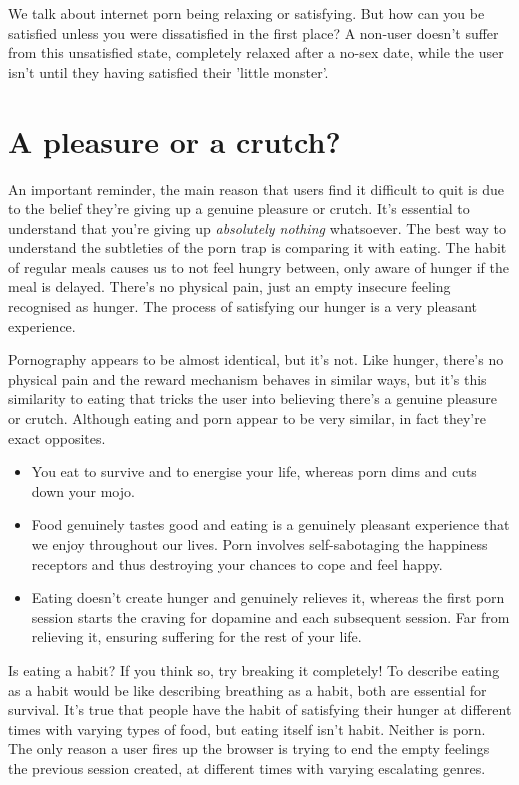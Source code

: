 \documentclass[easypeasy.tex]{subfiles}
\begin{document}
We talk about internet porn being relaxing or satisfying. But how can you be satisfied unless you were dissatisfied in the first place? A non-user doesn't suffer from this unsatisfied state, completely relaxed after a no-sex date, while the user isn't until they having satisfied their 'little monster'.

\section{A pleasure or a crutch?}
An important reminder, the main reason that users find it difficult to quit is due to the belief they're giving up a genuine pleasure or crutch. It's essential to understand that you're giving up \textit{absolutely nothing} whatsoever. The best way to understand the subtleties of the porn trap is comparing it with eating. The habit of regular meals causes us to not feel hungry between, only aware of hunger if the meal is delayed. There's no physical pain, just an empty insecure feeling recognised as hunger. The process of satisfying our hunger is a very pleasant experience.

Pornography appears to be almost identical, but it's not. Like hunger, there's no physical pain and the reward mechanism behaves in similar ways, but it's this similarity to eating that tricks the user into believing there's a genuine pleasure or crutch. Although eating and porn appear to be very similar, in fact they're exact opposites.

\begin{itemize}
  \item You eat to survive and to energise your life, whereas porn dims and cuts down your mojo.
  \item Food genuinely tastes good and eating is a genuinely pleasant experience that we enjoy throughout our lives. Porn involves self-sabotaging the happiness receptors and thus destroying your chances to cope and feel happy.
  \item Eating doesn't create hunger and genuinely relieves it, whereas the first porn session starts the craving for dopamine and each subsequent session. Far from relieving it, ensuring suffering for the rest of your life.
  \end{itemize}

Is eating a habit? If you think so, try breaking it completely! To describe eating as a habit would be like describing breathing as a habit, both are essential for survival. It's true that people have the habit of satisfying their hunger at different times with varying types of food, but eating itself isn't habit. Neither is porn. The only reason a user fires up the browser is trying to end the empty feelings the previous session created, at different times with varying escalating genres.
\end{document}
